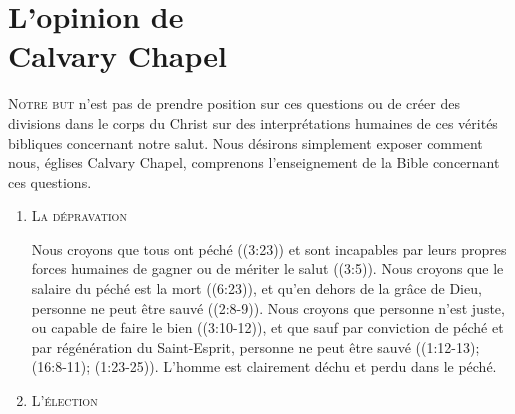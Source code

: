 \chapter[L'opinion de Calvary Chapel]{L'opinion de\\ Calvary Chapel}

\begin{specialpar}{}
\lettrine{N}{otre but} n'est pas de prendre position sur ces questions
  ou de créer des \pocketlinebreak
 divisions dans le corps du Christ
 sur des interprétations humaines de ces vérités bibliques
 concernant notre salut.
 Nous désirons simplement exposer comment nous,
 églises Calvary Chapel, comprenons l'en\-sei\-gnement de la Bible
 concernant ces questions.
\end{specialpar}
 
\begin{enumerate}

  \item  \textsc{La dépravation}

\nobreak
\begin{specialpar}{}
Nous croyons que tous ont péché
 ((3:23)) et
 sont incapables par leurs propres forces humaines de gagner ou
 de mériter le salut ((3:5)).
 Nous croyons que le \pocketlinebreak
 salaire du péché est la mort ((6:23)),
 et qu'en dehors de la grâce de Dieu, personne ne peut être sauvé
 ((2:8-9)).
 Nous cro\-yons que personne n'est juste, ou \pocketlinebreak 
 capable de faire le bien
 (\BRallowhypbch{}(3:10-12)\BRforbidhypbch), et que sauf par
 conviction de péché et par régénération du Saint-Esprit, personne ne peut être sauvé
 (\BRallowhypbch{}(1:12-13);
 (16:8-11);
 (1:23-25)\BRforbidhypbch).
 L'homme est clairement déchu et perdu dans le péché.
\end{specialpar}


  \item  \textsc{L'élection}


\end{enumerate}
